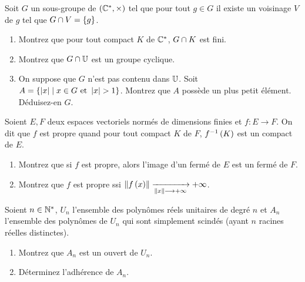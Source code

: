 \begin{exo}
Soit \(G\) un sous-groupe de \(\groupe{\Cs}[\times]\) tel que pour tout \(g\in G\) il existe un voisinage \(V\) de \(g\) tel que \(G\cap V=\left\lbrace g\right\rbrace\).

\begin{enumerate}
    \item Montrez que pour tout compact \(K\) de \(\mathbb{C}^*\), \(G\cap K\) est fini. \\
    \item Montrez que \(G\cap\mathbb{U}\) est un groupe cyclique. \\
    \item On suppose que \(G\) n'est pas contenu dans \(\mathbb{U}\). Soit \(A=\left\lbrace\left\lvert x\right\rvert\;\middle|\; x\in G\text{ et }\left\lvert x\right\rvert>1\right\rbrace\). Montrez que \(A\) possède un plus petit élément. Déduisez-en \(G\).
\end{enumerate}
\end{exo}



\begin{exo}
Soient \(E,F\) deux espaces vectoriels normés de dimensions finies et \(f:E\to F\). On dit que \(f\) est propre quand pour tout compact \(K\) de \(F\), \(f^{-1}\left(K\right)\) est un compact de \(E\).

\begin{enumerate}
    \item Montrez que si \(f\) est propre, alors l'image d'un fermé de \(E\) est un fermé de \(F\). \\
    \item Montrez que \(f\) est propre ssi \(\norme{f\paren{x}}\tendqd{\norme{x}\to\pinf}\pinf\).
\end{enumerate}
\end{exo}



\begin{exo}[Oral X, 7]
Soient \(n\in\mathbb{N}^*\), \(U_n\) l'ensemble des polynômes réels unitaires de degré \(n\) et \(A_n\) l'ensemble des polynômes de \(U_n\) qui sont simplement scindés (\ie ayant \(n\) racines réelles distinctes).

\begin{enumerate}
    \item Montrez que \(A_n\) est un ouvert de \(U_n\). \\
    \item Déterminez l'adhérence de \(A_n\).
\end{enumerate}
\end{exo}

